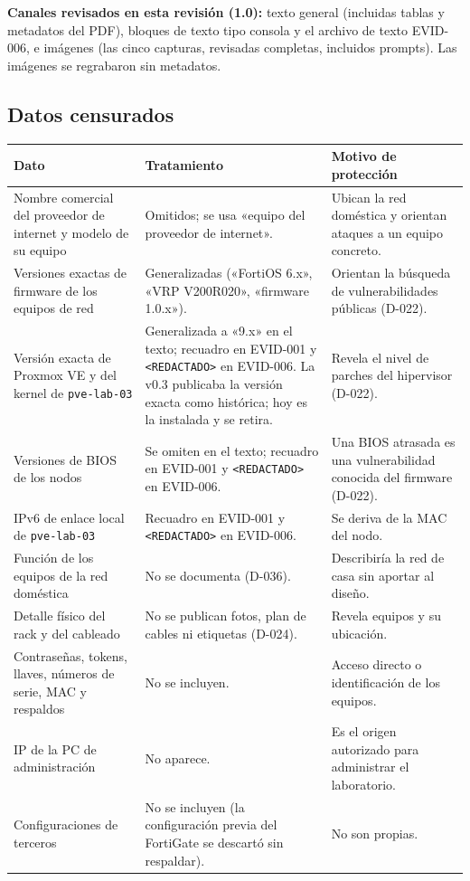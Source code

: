 \documentclass[11pt,a4paper]{article}
\begin{document}
\textbf{Canales revisados en esta revisión (1.0):} texto general (incluidas tablas y metadatos del PDF), bloques de texto tipo consola y el archivo de texto EVID-006, e imágenes (las cinco capturas, revisadas completas, incluidos prompts). Las imágenes se regrabaron sin metadatos.

\subsection{Datos censurados}
{\small
\begin{longtable}{L{3.4cm} L{6.0cm} L{5.6cm}}
  \toprule
  \textbf{Dato} & \textbf{Tratamiento} & \textbf{Motivo de protección}\\
  \midrule
  \endhead
  Nombre comercial del proveedor de internet y modelo de su equipo & Omitidos; se usa «equipo del proveedor de internet». & Ubican la red doméstica y orientan ataques a un equipo concreto.\\
  Versiones exactas de firmware de los equipos de red & Generalizadas («FortiOS 6.x», «VRP V200R020», «firmware 1.0.x»). & Orientan la búsqueda de vulnerabilidades públicas (D-022).\\
  Versión exacta de Proxmox VE y del kernel de \texttt{pve-lab-03} & Generalizada a «9.x» en el texto; recuadro en EVID-001 y \texttt{<REDACTADO>} en EVID-006. La v0.3 publicaba la versión exacta como histórica; hoy es la instalada y se retira. & Revela el nivel de parches del hipervisor (D-022).\\
  Versiones de BIOS de los nodos & Se omiten en el texto; recuadro en EVID-001 y \texttt{<REDACTADO>} en EVID-006. & Una BIOS atrasada es una vulnerabilidad conocida del firmware (D-022).\\
  IPv6 de enlace local de \texttt{pve-lab-03} & Recuadro en EVID-001 y \texttt{<REDACTADO>} en EVID-006. & Se deriva de la MAC del nodo.\\
  Función de los equipos de la red doméstica & No se documenta (D-036). & Describiría la red de casa sin aportar al diseño.\\
  Detalle físico del rack y del cableado & No se publican fotos, plan de cables ni etiquetas (D-024). & Revela equipos y su ubicación.\\
  Contraseñas, tokens, llaves, números de serie, MAC y respaldos & No se incluyen. & Acceso directo o identificación de los equipos.\\
  IP de la PC de administración & No aparece. & Es el origen autorizado para administrar el laboratorio.\\
  Configuraciones de terceros & No se incluyen (la configuración previa del FortiGate se descartó sin respaldar). & No son propias.\\
  \bottomrule
\end{longtable}
}
\end{document}
